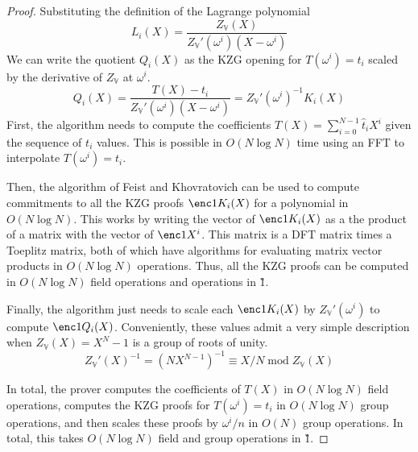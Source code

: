 \documentclass[11pt]{article} %
\renewcommand{\mod}{\ensuremath{\;\mathrm{mod}\;}}
\newcommand{\bigspace}{\ensuremath{\mathbb{V}}\xspace}
\newcommand{\tabsize}{\ensuremath{N}\xspace}
\newcommand{\tabruntime}{\ensuremath{\tabsize\log\tabsize}\xspace}
\begin{document}
\begin{proof} 
    Substituting the definition of the Lagrange polynomial
    \[L_i(X) = \frac{Z_\bigspace(X)}{Z_\bigspace'(\omega^i) (X - \omega^i)}\]
    We can write the quotient $Q_i(X)$ as the KZG opening for $T(\omega^i) = t_i$ scaled by
    the derivative of $Z_\bigspace$ at $\omega^i$.
    \[Q_i(X) = \frac{T(X) - t_i}{Z_\bigspace'(\omega^i) (X - \omega^i)} =
    Z_\bigspace'(\omega^i)^{-1} K_i(X) \]
    First, the algorithm needs to compute the coefficients $T(X) =
    \sum_{i=0}^{\tabsize-1} \hat{t}_i X^i$ given the sequence of $t_i$ values. This is
    possible in $O(\tabruntime)$ time using an FFT to interpolate $T(\omega^i) =
    t_i$.

    Then, the algorithm of Feist and Khovratovich \cite{fastkzgproofsorig, fastkzgproofs} 
    can be used to compute commitments to all the KZG proofs $\enc1{K_i(X)}$ for a
    polynomial in $O(\tabruntime)$. This works by writing the vector of
    $\enc1{K_i(X)}$ as a the product of a matrix with the vector of
    $\enc1{X^i}$. This matrix is a DFT matrix times a Toeplitz matrix, both of
    which have algorithms for evaluating matrix vector products in
    $O(\tabruntime)$ operations. Thus, all the KZG proofs can be computed in
    $O(\tabruntime)$ field operations and operations in \G1.
    
    Finally, the algorithm just needs to scale each $\enc1{K_i(X)}$ by
    $Z_{\bigspace}'(\omega^i)$ to compute $\enc1{Q_i(X)}$. Conveniently, these
    values admit a very simple description when $Z_\bigspace(X) = X^\tabsize -
    1$ is a group of roots of unity.
    \[Z_\bigspace'(X)^{-1} = (\tabsize X^{\tabsize-1})^{-1} \equiv X / \tabsize \mod Z_\bigspace(X)\] 

    In total, the prover computes the coefficients of $T(X)$ in $O(\tabruntime)$
    field operations, computes the KZG proofs for $T(\omega^i) = t_i$ in
    $O(\tabruntime)$ group operations, and then scales these proofs by $\omega^i
    / n$ in $O(\tabsize)$ group operations. In total, this takes
    $O(\tabruntime)$ field and group operations in \G1.
\end{proof}
\end{document}
